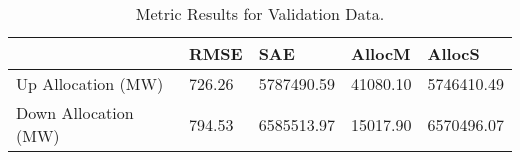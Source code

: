 \begin{table}[H] 
    \caption{Metric Results for Validation Data. \label{validation_res}}
    \begin{tabularx}{\textwidth}{CCCCC}
    \toprule
    & \textbf{RMSE}	& \textbf{SAE}	& \textbf{AllocM} & \textbf{AllocS}\\
    \midrule
    Up Allocation (MW) & 726.26 & 5787490.59 & 41080.10 & 5746410.49 \\
    Down Allocation (MW) & 794.53 & 6585513.97 & 15017.90 & 6570496.07 \\
        \bottomrule
    \end{tabularx}
\end{table}

